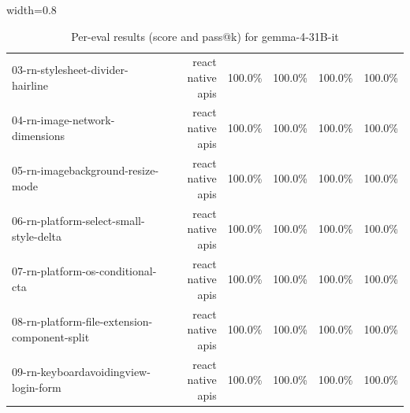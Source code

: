\begin{table}[htbp]
\begin{adjustbox}{width=0.8\textwidth}
\begin{tabular}{lrrrrr}
03-rn-stylesheet-divider-hairline & react native apis & 100.0\% & 100.0\% & 100.0\% & 100.0\% \\
04-rn-image-network-dimensions & react native apis & 100.0\% & 100.0\% & 100.0\% & 100.0\% \\
05-rn-imagebackground-resize-mode & react native apis & 100.0\% & 100.0\% & 100.0\% & 100.0\% \\
06-rn-platform-select-small-style-delta & react native apis & 100.0\% & 100.0\% & 100.0\% & 100.0\% \\
07-rn-platform-os-conditional-cta & react native apis & 100.0\% & 100.0\% & 100.0\% & 100.0\% \\
08-rn-platform-file-extension-component-split & react native apis & 100.0\% & 100.0\% & 100.0\% & 100.0\% \\
09-rn-keyboardavoidingview-login-form & react native apis & 100.0\% & 100.0\% & 100.0\% & 100.0\% \\
\bottomrule
\end{tabular}
\end{adjustbox}
\caption{Per-eval results (score and pass@k) for gemma-4-31B-it}
\end{table}
